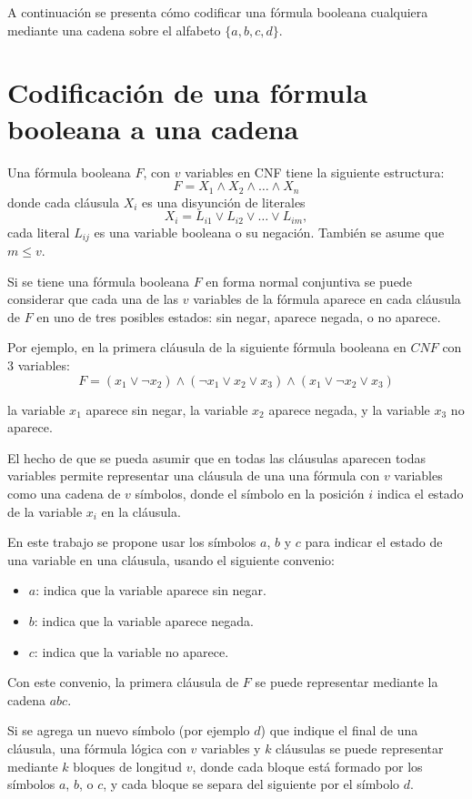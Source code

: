 \documentclass[12pt]{article}
\begin{document}
A continuación se presenta cómo codificar una fórmula booleana cualquiera mediante una cadena sobre el alfabeto $\{a,b,c,d\}$.

\section{Codificación de una fórmula booleana a una cadena}
\label{sec:codsat}

Una fórmula booleana $F$, con $v$ variables en CNF tiene la siguiente estructura:
$$F=X_1 \wedge X_2 \wedge \ldots \wedge X_n$$
donde cada cláusula $X_i$ es una disyunción de literales
$$X_i=L_{i1} \vee L_{i2} \vee \ldots \vee L_{im},$$
cada literal $L_{ij}$ es una variable booleana o su negación. También se asume que $m\leq v$. 

Si se tiene una fórmula booleana $F$ en forma normal conjuntiva se puede considerar que cada una de 
las $v$ variables de la fórmula aparece en cada cláusula de $F$ en uno de tres posibles estados: 
sin negar, aparece negada, o  no aparece.

Por ejemplo, en la primera cláusula de la siguiente fórmula booleana en $CNF$ con 3 variables:
$$F=(x_1 \vee \neg x_2) \wedge (\neg x_1 \vee x_2 \vee x_3) \wedge (x_1 \vee \neg x_2 \vee x_3)$$

la variable $x_1$ aparece sin negar, la variable $x_2$ aparece negada, y la variable $x_{3}$ no aparece.

El hecho de que se pueda asumir que en todas las cláusulas aparecen todas variables permite representar una cláusula de una una fórmula con $v$ variables como una cadena de $v$ símbolos, donde el símbolo en la posición $i$ indica el estado de la variable $x_i$ en la cláusula.

En este trabajo se propone usar los símbolos $a$, $b$ y $c$ para indicar el estado de una variable en una cláusula, usando el siguiente convenio:

\begin{itemize}
    \item $a$: indica que la variable aparece sin negar.
    \item $b$: indica que la variable aparece negada.
    \item $c$: indica que la variable no aparece.
\end{itemize}

Con este convenio, la primera cláusula de $F$ se puede representar mediante la cadena $abc$.

Si se agrega un nuevo símbolo (por ejemplo $d$) que indique el final de una cláusula, una fórmula lógica con $v$ variables y $k$ cláusulas se puede representar mediante $k$ bloques de longitud $v$, donde cada bloque está formado por los símbolos $a$, $b$, o $c$, y cada bloque se separa del siguiente por el símbolo $d$.
\end{document}
